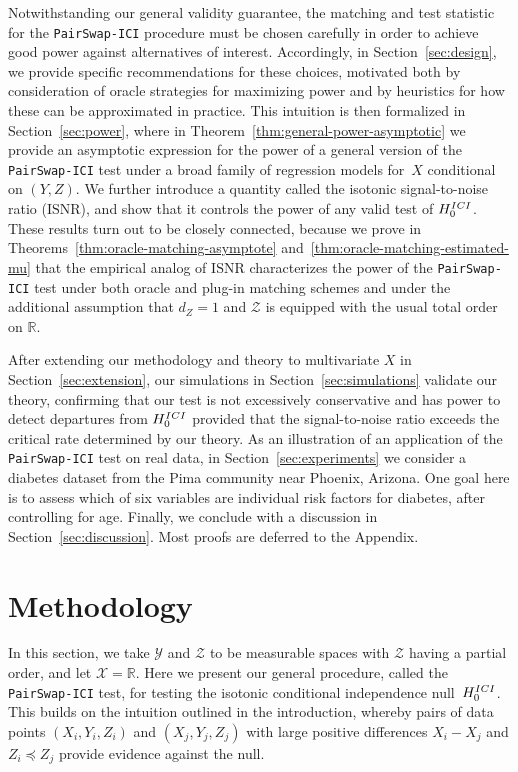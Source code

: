 \documentclass[12pt]{article}
\newcommand{\ISNR}{\mathrm{ISNR}}
\begin{document}
Notwithstanding our general validity guarantee, the matching and test statistic for the \textnormal{\texttt{PairSwap-ICI}} procedure must be chosen carefully in order to achieve good power against alternatives of interest. Accordingly, in Section~\ref{sec:design}, we provide specific recommendations for these choices, motivated both by consideration of oracle strategies for maximizing power and by heuristics for how these can be approximated in practice. 
This intuition is then formalized in Section~\ref{sec:power}, where in Theorem~\ref{thm:general-power-asymptotic} we provide an asymptotic expression for the power of a general version of the \textnormal{\texttt{PairSwap-ICI}} test under a broad family of regression models for~$X$ conditional on $(Y,Z)$. We further introduce a quantity called the isotonic signal-to-noise ratio ($\ISNR$), and show that it controls the power of any valid test of $H_0^{\textnormal{ICI}}$.  These results turn out to be closely connected, because  we prove in Theorems~\ref{thm:oracle-matching-asymptote} and~\ref{thm:oracle-matching-estimated-mu} that the empirical analog of $\ISNR$ characterizes the power of the \texttt{PairSwap-ICI} test under both oracle and plug-in matching schemes and under the additional assumption that $d_Z=1$ and $\mathcal{Z}$ is equipped with the usual total order on $\mathbb{R}$. 

After extending our methodology and theory to multivariate $X$ in Section~\ref{sec:extension}, our simulations in Section~\ref{sec:simulations} validate our theory, confirming that our test is not excessively conservative and has power to detect departures from $H_0^{\textnormal{ICI}}$ provided that the signal-to-noise ratio exceeds the critical rate determined by our theory.  As an illustration of an application of the \textnormal{\texttt{PairSwap-ICI}} test on real data, in Section~\ref{sec:experiments} we consider a diabetes dataset from the Pima community near Phoenix, Arizona.  One goal here is to assess which of six variables are individual risk factors for diabetes, after controlling for age.  Finally, we conclude with a discussion in Section~\ref{sec:discussion}. Most proofs are deferred to the Appendix.


\section{Methodology}\label{sec:method}

In this section, we take $\mathcal{Y}$ and $\mathcal{Z}$ to be measurable spaces with $\mathcal{Z}$ having a partial order, and let $\mathcal{X} = \mathbb{R}$. Here we present our general procedure, called the \textnormal{\texttt{PairSwap-ICI}} test, for testing the isotonic conditional independence null~$H_0^{\textnormal{ICI}}$.  This builds on the intuition outlined in the introduction, whereby pairs of data points $(X_i,Y_i,Z_i)$ and $(X_j,Y_j,Z_j)$ with large positive differences $X_i - X_j$ and $Z_i\preceq Z_j$ provide evidence against the null.
\end{document}
